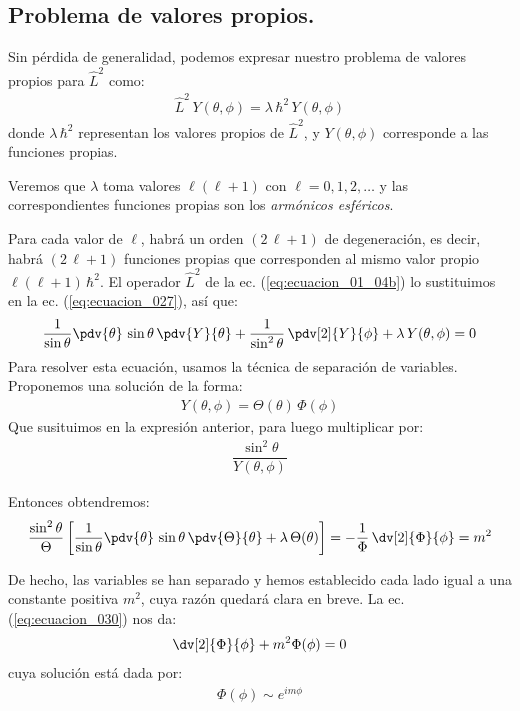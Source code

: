 \subsection{Problema de valores propios.}

Sin pérdida de generalidad, podemos expresar nuestro problema de valores propios para $\hat{L}^{2}$ como:
\begin{align}
\hat{L}^{2} \, Y(\theta, \phi) = \lambda \, \hbar^{2} \, Y(\theta, \phi)
\label{eq:ecuacion_027}
\end{align}
donde $\lambda \, \hbar^{2}$ representan los valores propios de $\hat{L}^{2}$, y $Y(\theta, \phi)$ corresponde a las funciones propias. 
\par
Veremos que $\lambda$ toma valores $\ell (\ell + 1)$ con $\ell = 0, 1, 2, \ldots$ y las correspondientes funciones propias son los \emph{armónicos esféricos}.
\par
Para cada valor de $\ell$, habrá un orden $(2 \, \ell + 1)$ de degeneración, es decir, habrá $(2 \, \ell + 1)$ funciones propias que corresponden al mismo valor propio $\ell (\ell + 1) \, \hbar^{2}$. El operador $\hat{L}^{2}$ de la ec. (\ref{eq:ecuacion_01_04b}) lo sustituimos en la ec. (\ref{eq:ecuacion_027}), así que:
\begin{align}
\dfrac{1}{\sin \theta} \pdv{\theta} \, \sin \theta \, \pdv{Y}{\theta} + \dfrac{1}{\sin^{2} \theta} \, \pdv[2]{Y}{\phi} + \lambda \, Y(\theta, \phi) = 0
\end{align}
Para resolver esta ecuación, usamos la técnica de separación de variables. Proponemos una solución de la forma:
\begin{align}
Y(\theta, \phi) = \Theta(\theta) \, \Phi(\phi)
\label{eq:ecuacion_029}
\end{align}
Que susituimos en la expresión anterior, para luego multiplicar por:
\begin{align*}
\dfrac{\sin^{2} \theta}{Y(\theta, \phi)}
\end{align*}

Entonces obtendremos:
\begin{align}
\dfrac{\sin^{2} \theta}{\Theta} \left[ \dfrac{1}{\sin \theta} \pdv{\theta} \, \sin \theta \, \pdv{\Theta}{\theta} + \lambda \, \Theta (\theta) \right] = -  \dfrac{1}{\Phi} \, \dv[2]{\Phi}{\phi} = m^{2}
\label{eq:ecuacion_030}
\end{align}

De hecho, las variables se han separado y hemos establecido cada lado igual a una constante positiva $m^{2}$, cuya razón quedará clara en breve. La ec. (\ref{eq:ecuacion_030}) nos da:
\begin{align*}
\dv[2]{\Phi}{\phi} + m^{2} \Phi (\phi) = 0
\end{align*}
cuya solución está dada por:
\begin{align*}
\Phi(\phi) \sim e^{i m \phi}
\end{align*}

